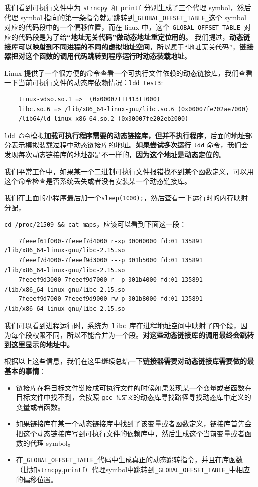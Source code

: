 \documentclass[UTF8,a4paper,12pt]{ctexbook}
\begin{document}
			我们看到可执行文件中为 \verb|strncpy 和 printf| 分别生成了三个代理 symbol，然后代理 symbol 指向的第一条指令就是跳转到\verb|_GLOBAL_OFFSET_TABLE_|这个 symbol 对应的代码段中的一个偏移位置，而在 linux 中，这个\verb|_GLOBAL_OFFSET_TABLE_|对应的代码段是为了给\textbf{“地址无关代码”做动态地址重定位用的}。
			我们提过，\textbf{动态链接库可以映射到不同进程的不同的虚拟地址空间}，所以属于“地址无关代码”，\textbf{链接器把对这个函数的调用代码跳转到程序运行时动态装载地址}。
			
			Linux 提供了一个很方便的命令查看一个可执行文件依赖的动态链接库，我们查看一下当前可执行文件的动态库依赖情况：\verb|ldd test3|:
			\begin{lstlisting}
    linux-vdso.so.1 =>  (0x00007fff413ff000)
    libc.so.6 => /lib/x86_64-linux-gnu/libc.so.6 (0x00007fe202ae7000)
    /lib64/ld-linux-x86-64.so.2 (0x00007fe202eb2000)	
			\end{lstlisting}
			
			\verb|ldd 命令|模拟\textbf{加载可执行程序需要的动态链接库，但并不执行程序}，后面的地址部分表示模拟装载过程中动态链接库的地址。\textbf{如果尝试多次运行} \verb|ldd| 命令，我们会发现每次动态链接库的地址都是不一样的，\textbf{因为这个地址是动态定位的}。
			
			我们平常工作中，如果某一个二进制可执行文件报错找不到某个函数定义，可以用这个命令检查是否系统丢失或者没有安装某一个动态链接库。
			
			我们在上面的小程序最后加一个\verb|sleep(1000);|，然后查看一下运行时的内存映射分配，
			
			\verb|cd /proc/21509 && cat maps|，应该可以看到下面这一段：
			\begin{lstlisting}
	7feeef61f000-7feeef7d4000 r-xp 00000000 fd:01 135891                     /lib/x86_64-linux-gnu/libc-2.15.so
	7feeef7d4000-7feeef9d3000 ---p 001b5000 fd:01 135891                     /lib/x86_64-linux-gnu/libc-2.15.so
	7feeef9d3000-7feeef9d7000 r--p 001b4000 fd:01 135891                     /lib/x86_64-linux-gnu/libc-2.15.so
	7feeef9d7000-7feeef9d9000 rw-p 001b8000 fd:01 135891                     /lib/x86_64-linux-gnu/libc-2.15.so
			\end{lstlisting}
			
			我们可以看到进程运行时，系统为\verb| libc |库在进程地址空间中映射了四个段，因为每个段权限不同，所以不能合并为一个段。\textbf{对这些动态链接库的调用最终会跳转到这里显示的地址中。}
			
			根据以上这些信息，我们在这里继续总结一下\textbf{链接器需要对动态链接库需要做的最基本的事情}：
			\begin{itemize}[itemindent = 1em]
				\item 链接库在将目标文件链接成可执行文件的时候如果发现某一个变量或者函数在目标文件中找不到，会按照 \verb|gcc 预定义|的动态库寻找路径寻找动态库中定义的变量或者函数。
				\item 如果链接库在某一个动态链接库中找到了该变量或者函数定义，链接库首先会把这个动态链接库写到可执行文件的依赖库中，然后生成这个当前变量或者函数的代理 symbol。
				\item  在\verb|_GLOBAL_OFFSET_TABLE_|代码中生成真正的动态跳转指令，并且在库函数（比如\verb|strncpy|,\verb|printf|）代理symbol中跳转到\verb|_GLOBAL_OFFSET_TABLE_|中相应的偏移位置。
			\end{itemize}
			
\end{document}
